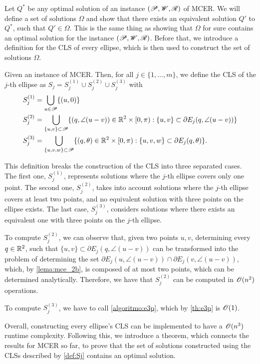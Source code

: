 Let $Q^*$ be any optimal solution of an instance $(\mathscr{P}, \mathscr{W}, \mathscr{R})$ of MCER. We will define a set of solutions $\Omega$ and show that there exists an equivalent solution $Q'$ to  $Q^*$, such that $Q' \in \Omega$. This is the same thing as showing that $\Omega$ for sure contains an optimal solution for the instance $(\mathscr{P}, \mathscr{W}, \mathscr{R})$.
Before that, we introduce a definition for the CLS of every ellipse, which is then used to construct the set of solutions $\Omega$.

\begin{definicao}\label{def:Sj}
	Given an instance of MCER. Then, for all $j\in\{1, \dots, m\}$, we define the CLS of the $j$-th ellipse as $S_j = S_j^{(1)} \cup S_j^{(2)} \cup S_j^{(3)}$ with
\begin{align*}
S_j^{(1)} &= \bigcup_{u \in \mathscr{P}} \{(u, 0)\}\\
S_j^{(2)} &= \bigcup_{\{u, v\} \subset \mathscr{P}} \{(q, \angle(u-v))\in \mathbb{R}^2\times[0, \pi): \{u,v\} \subset \partial E_j(q, \angle(u-v))\}\\
S_j^{(3)} &= \bigcup_{\{u, v, w\} \subset \mathscr{P}} \{(q, \theta)\in \mathbb{R}^2\times[0, \pi): \{u, v, w\} \subset \partial E_j(q, \theta)\}.
\end{align*}
\end{definicao}

This definition breaks the construction of the CLS into three separated cases. The first one, $S_j^{(1)}$, represents solutions where the $j$-th ellipse covers only one point. The second one, $S_j^{(2)}$, takes into account solutions where the $j$-th ellipse covers at least two points, and no equivalent solution with three points on the ellipse exists. The last case, $S_j^{(3)}$, considers solutions where there exists an equivalent one with three points on the $j$-th ellipse. 

To compute $S_j^{(2)}$, we can observe that, given two points $u, v$, determining every $q\in\mathbb{R}^2$, such that $\{u,v\}\subset\partial E_j(q, \angle(u-v))$ can be transformed into the problem of determining the set $\partial E_j(u, \angle(u-v)) \cap \partial E_j(v, \angle(u-v))$, which, by \autoref{lema:mce_2b}, is composed of at most two points, which can be determined analytically. Therefore, we have that $S_j^{(2)}$ can be computed in $\mathscr{O}(n^2)$ operations.

To compute $S_j^{(3)}$, we have to call \autoref{algoritmo:e3p}, which by \autoref{th:e3p} is $\mathscr{O}(1)$.

Overall, constructing every ellipse's CLS can be implemented to have a $\mathscr{O}(n^3)$ runtime complexity.
Following this, we introduce a theorem, which connects the results for MCER so far, to prove that the set of solutions constructed using the CLSs described by \autoref{def:Sj} contains an optimal solution.

